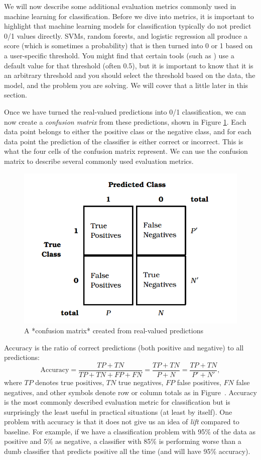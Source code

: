 \documentclass[]{krantz}
\begin{document}
We will now describe some additional evaluation metrics commonly used in
machine learning for classification. Before we dive into metrics, it is
important to highlight that machine learning models for classification
typically do not predict 0/1 values directly. SVMs, random forests, and
logistic regression all produce a score (which is sometimes a
probability) that is then turned into 0 or 1 based on a user-specific
threshold. You might find that certain tools (such as ) use a default
value for that threshold (often 0.5), but it is important to know that
it is an arbitrary threshold and you should select the threshold based
on the data, the model, and the problem you are solving. We will cover
that a little later in this section.

Once we have turned the real-valued predictions into 0/1 classification,
we can now create a \emph{confusion matrix} from these predictions,
shown in Figure \ref{fig:cm}. Each data point belongs to either the
positive class or the negative class, and for each data point the
prediction of the classifier is either correct or incorrect. This is
what the four cells of the confusion matrix represent. We can use the
confusion matrix to describe several commonly used evaluation metrics.

\begin{figure}

{\centering \includegraphics[width=0.7\linewidth]{ChapterML/figures/cm} 

}

\caption{A *confusion matrix* created from real-valued predictions}\label{fig:cm}
\end{figure}

Accuracy is the ratio of correct predictions (both positive and
negative) to all predictions:
\[\textrm{Accuracy}=\frac{TP + TN}{TP + TN + FP + FN}=\frac{TP + TN}{P+N}=\frac{TP + TN}{P'+N'},\]
where \(TP\) denotes true positives, \(TN\) true negatives, \(FP\) false
positives, \(FN\) false negatives, and other symbols denote row or
column totals as in Figure~. Accuracy is the most commonly described
evaluation metric for classification but is surprisingly the least
useful in practical situations (at least by itself). One problem with
accuracy is that it does not give us an idea of \emph{lift} compared to
baseline. For example, if we have a classification problem with 95\% of
the data as positive and 5\% as negative, a classifier with 85\% is
performing worse than a dumb classifier that predicts positive all the
time (and will have 95\% accuracy).
\end{document}
